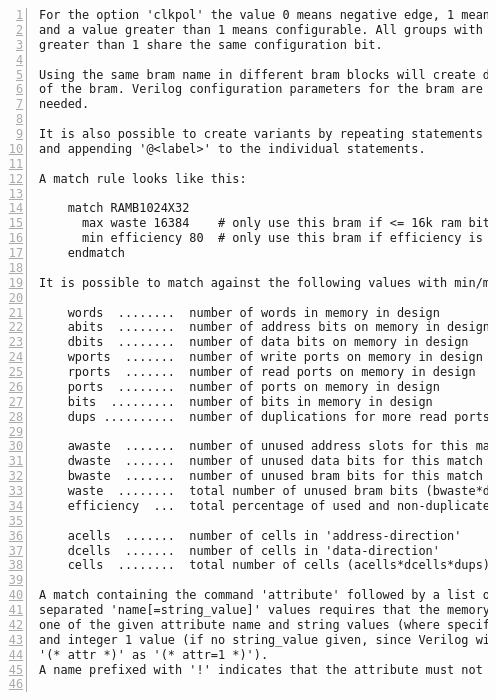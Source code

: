 \begin{lstlisting}[numbers=left,frame=single]
For the option 'clkpol' the value 0 means negative edge, 1 means positive edge
and a value greater than 1 means configurable. All groups with the same value
greater than 1 share the same configuration bit.

Using the same bram name in different bram blocks will create different variants
of the bram. Verilog configuration parameters for the bram are created as
needed.

It is also possible to create variants by repeating statements in the bram block
and appending '@<label>' to the individual statements.

A match rule looks like this:

    match RAMB1024X32
      max waste 16384    # only use this bram if <= 16k ram bits are unused
      min efficiency 80  # only use this bram if efficiency is at least 80%
    endmatch

It is possible to match against the following values with min/max rules:

    words  ........  number of words in memory in design
    abits  ........  number of address bits on memory in design
    dbits  ........  number of data bits on memory in design
    wports  .......  number of write ports on memory in design
    rports  .......  number of read ports on memory in design
    ports  ........  number of ports on memory in design
    bits  .........  number of bits in memory in design
    dups ..........  number of duplications for more read ports

    awaste  .......  number of unused address slots for this match
    dwaste  .......  number of unused data bits for this match
    bwaste  .......  number of unused bram bits for this match
    waste  ........  total number of unused bram bits (bwaste*dups)
    efficiency  ...  total percentage of used and non-duplicated bits

    acells  .......  number of cells in 'address-direction'
    dcells  .......  number of cells in 'data-direction'
    cells  ........  total number of cells (acells*dcells*dups)

A match containing the command 'attribute' followed by a list of space
separated 'name[=string_value]' values requires that the memory contains any
one of the given attribute name and string values (where specified), or name
and integer 1 value (if no string_value given, since Verilog will interpret
'(* attr *)' as '(* attr=1 *)').
A name prefixed with '!' indicates that the attribute must not exist.


\end{lstlisting}

